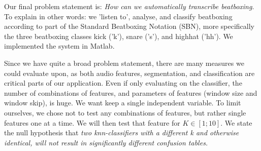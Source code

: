 Our final problem statement is: \textit{How can we automatically transcribe beatboxing}. To explain in other words: we 'listen to', analyse, and classify beatboxing according to part of the Standard Beatboxing Notation (SBN), more specifically the three beatboxing classes kick ('k'), snare ('s'), and highhat ('hh'). We implemented the system in Matlab\sup{\textregistered}.


Since we have quite a broad problem statement, there are many measures we could evaluate upon, as both audio features, segmentation, and classification are critical parts of our application. Even if only evaluating on the classifier, the number of combinations of features, and parameters of features (window size and window skip), is huge. We want keep a single independent variable. To limit ourselves, we chose not to test any combinations of features, but rather single features one at a time. We will then test that feature for $K \in [1;10]$. We state the null hypothesis that \emph{two knn-classifiers with a different k and otherwise identical, will not result in significantly different confusion tables.}

